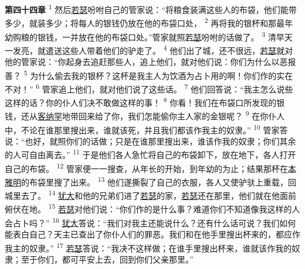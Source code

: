 \textbf{第四十四章\quad}
\textsuperscript{1}
然后\uline{若瑟}吩咐自己的管家说：“将粮食装满这些人的布袋，他们能带多少，就装多少；将每人的银钱仍放在他的布袋口处，
\textsuperscript{2}
再将我的银杯和那最年幼购粮的银钱，一并放在他的布袋口处。”管家就照\uline{若瑟}吩咐的话做了。
\textsuperscript{3}
清早天一发亮，就遣送这些人带着他们的驴走了。
\textsuperscript{4}
他们出了城，还不很远，\uline{若瑟}就对他的管家说：“你起身去追赶那些人，追上他们，就对他们说：你们为什么以恶报善？
\textsuperscript{5}
为什么偷去我的银杯？这杯是我主人为饮酒为占卜用的啊！你们作的实在不对！”
\textsuperscript{6}
管家追上他们，就对他们说了这些话。
\textsuperscript{7}
他们回答说：“我主怎么说些这样的话？你的仆人们决不敢做这样的事！
\textsuperscript{8}
你看！我们在布袋口所发现的银钱，还从\uline{客纳罕}地带回来给了你，我们怎能偷你主人家的金银呢？
\textsuperscript{9}
在你仆人中，不论在谁那里搜出来，谁就该死，并且我们都该作我主的奴隶。”
\textsuperscript{10}
管家答说：“也好，就照你们的话做；只是在谁那里搜出来，谁该作我的奴隶；你们其余的人可自由离去。”
\textsuperscript{11}
于是他们各人急忙将自己的布袋卸下，放在地下，各人打开自己的布袋。
\textsuperscript{12}
管家便一一搜查，从年长的开始，到年幼的为止；结果那杯在\uline{本雅明}的布袋里搜了出来。
\textsuperscript{13}
他们遂撕裂了自己的衣服，各人又使驴驮上重载，回城里去了。
\textsuperscript{14}
\uline{犹大}和他的兄弟们进了\uline{若瑟}的家，\uline{若瑟}还在那里，他们就在他面前俯伏在地。
\textsuperscript{15}
\uline{若瑟}对他们说：“你们作的是什么事？难道你们不知道像我这样的人会占卜吗？”
\textsuperscript{16}
\uline{犹大}答说：“我们对我主还能说什么？还有什么话可说？我们如何能表白自己？天主已查出了你仆人们的罪恶。我们和在他手里搜出杯来的，都应作我主的奴隶。”
\textsuperscript{17}
\uline{若瑟}答说：“我决不这样做；在谁手里搜出杯来，谁就该作我的奴隶；至于你们，都可平安上去，回到你们父亲那里。”

